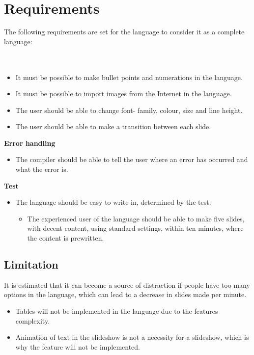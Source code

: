 \section{Requirements}
\label{LanguageRequirements}
The following requirements are set for the language to consider it as a complete language:
\\ \\
 \\
\begin{itemize}
\item It must be possible to make bullet points and numerations in the language.
\item It must be possible to import images from the Internet in the language.
\item The user should be able to change font- family, colour, size and line height.
\item The user should be able to make a transition between each slide.
\end{itemize}
\textbf{Error handling}
\begin{itemize}
\item The compiler should be able to tell the user where an error has occurred and what the error is.
\end{itemize}
\textbf{Test}
\begin{itemize}
\item The language should be easy to write in, determined by the test:
\begin{itemize}
\item The experienced user of the language should be able to make five slides, with decent content, using standard settings, within ten minutes, where the content is prewritten.
\end{itemize}
\end{itemize}

\subsection*{Limitation}
It is estimated that it can become a source of distraction if people have too many options in the language, which can lead to a decrease in slides made per minute.
\begin{itemize}
	\item Tables will not be implemented in the language due to the features complexity.
	\item Animation of text in the slideshow is not a necessity for a slideshow, which is why the feature will not be implemented.
\end{itemize}